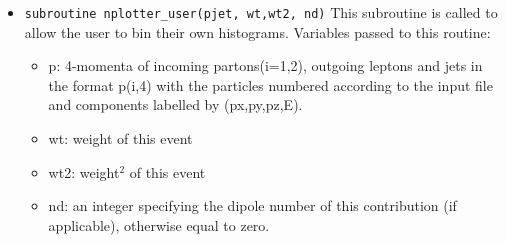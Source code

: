 \label{user}
\begin{itemize}
	\item {\tt subroutine nplotter\_user(pjet, wt,wt2, nd)}
	This subroutine is called to allow the user to bin their own       
	histograms. Variables passed to this routine:
	
	\begin{itemize}
		\item        p:  4-momenta of incoming partons(i=1,2), outgoing leptons 
		and                                                             
		jets in the format p(i,4) with the particles 
		numbered                                                                  
		according to the input file and components labelled 
		by                                                                 
		(px,py,pz,E).  
		
		
		\item        wt:  weight of this 
		event                                                                                                   
		
		
		\item       wt2:  weight$^2$ of this 
		event                                                                                                 
		
		
		\item        nd:  an integer specifying the dipole number of this 
		contribution                                                           
		(if applicable), otherwise equal to zero.
	\end{itemize}
	
\end{itemize}
